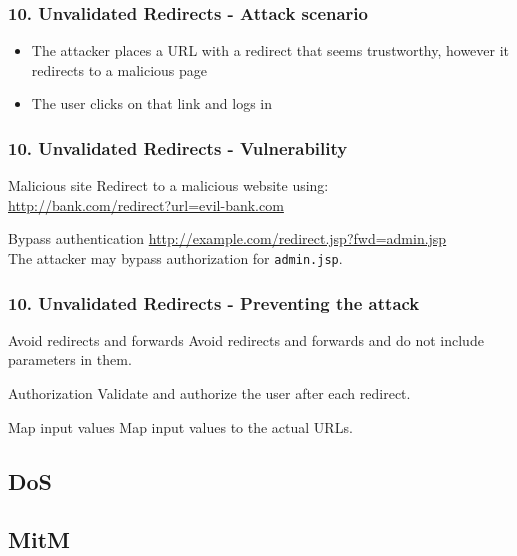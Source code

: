 \begin{frame}
\frametitle{10. Unvalidated Redirects - Attack scenario}
\begin{itemize}
\item The attacker places a URL with a redirect that seems trustworthy,
	however it redirects to a malicious page
\item The user clicks on that link and logs in
\end{itemize}
\end{frame}

\begin{frame}
\frametitle{10. Unvalidated Redirects - Vulnerability}
\begin{exampleblock}{Malicious site}
Redirect to a malicious website using:
\\ \url{http://bank.com/redirect?url=evil-bank.com}
\end{exampleblock}
\begin{exampleblock}{Bypass authentication}
\url{http://example.com/redirect.jsp?fwd=admin.jsp}
\\ The attacker may bypass authorization for \texttt{admin.jsp}.
\end{exampleblock}
\end{frame}

\begin{frame}
\frametitle{10. Unvalidated Redirects - Preventing the attack}
\begin{block}{Avoid redirects and forwards}
Avoid redirects and forwards and do not include parameters in them.
\end{block}
\begin{block}{Authorization}
Validate and authorize the user after each redirect.
\end{block}
\begin{exampleblock}{Map input values}
Map input values to the actual URLs.
\end{exampleblock}
\end{frame}

\subsection{DoS}

\subsection{MitM}

